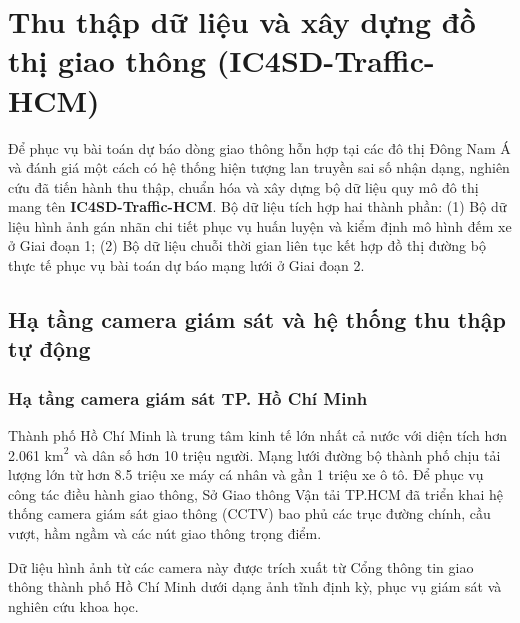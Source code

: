 \chapter{Thu thập dữ liệu và xây dựng đồ thị giao thông (IC4SD-Traffic-HCM)}
\label{chap:du_lieu}

Để phục vụ bài toán dự báo dòng giao thông hỗn hợp tại các đô thị Đông Nam Á và đánh giá một cách có hệ thống hiện tượng lan truyền sai số nhận dạng, nghiên cứu đã tiến hành thu thập, chuẩn hóa và xây dựng bộ dữ liệu quy mô đô thị mang tên \textbf{IC4SD-Traffic-HCM}. Bộ dữ liệu tích hợp hai thành phần: (1) Bộ dữ liệu hình ảnh gán nhãn chi tiết phục vụ huấn luyện và kiểm định mô hình đếm xe ở Giai đoạn 1; (2) Bộ dữ liệu chuỗi thời gian liên tục kết hợp đồ thị đường bộ thực tế phục vụ bài toán dự báo mạng lưới ở Giai đoạn 2.

\section{Hạ tầng camera giám sát và hệ thống thu thập tự động}
\label{sec:ha_tang_camera}

\subsection{Hạ tầng camera giám sát TP. Hồ Chí Minh}
Thành phố Hồ Chí Minh là trung tâm kinh tế lớn nhất cả nước với diện tích hơn 2.061 $\text{km}^2$ và dân số hơn 10 triệu người. Mạng lưới đường bộ thành phố chịu tải lượng lớn từ hơn 8.5 triệu xe máy cá nhân và gần 1 triệu xe ô tô. Để phục vụ công tác điều hành giao thông, Sở Giao thông Vận tải TP.HCM đã triển khai hệ thống camera giám sát giao thông (CCTV) bao phủ các trục đường chính, cầu vượt, hầm ngầm và các nút giao thông trọng điểm.

Dữ liệu hình ảnh từ các camera này được trích xuất từ Cổng thông tin giao thông thành phố Hồ Chí Minh dưới dạng ảnh tĩnh định kỳ, phục vụ giám sát và nghiên cứu khoa học.

